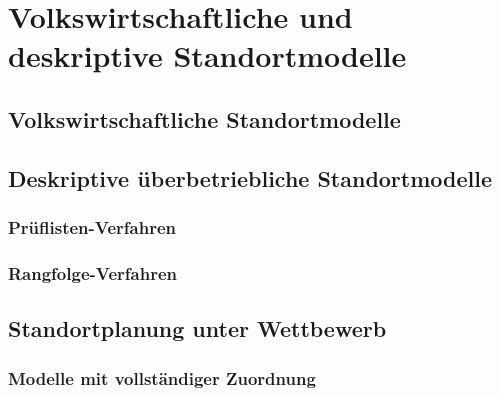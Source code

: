\section{Volkswirtschaftliche und deskriptive Standortmodelle} %
    \label{cha:volkswirtschaftliche_und_deskriptive_standortmodelle}

      \subsection{Volkswirtschaftliche Standortmodelle} %
      \label{sub:volkswirtschaftliche_standortmodelle}
      

      \subsection{Deskriptive überbetriebliche Standortmodelle} %
      \label{sub:deskriptive_berbetriebliche_standortmodelle}
      
        \subsubsection{Prüflisten-Verfahren} %
        \label{ssub:pr_flisten_verfahren}
        

        \subsubsection{Rangfolge-Verfahren} %
        \label{ssub:rangfolge_verfahren}
        


      \subsection{Standortplanung unter Wettbewerb} %
      \label{sec:standortplanung_unter_wettbewerb}

        \subsubsection{Modelle mit vollständiger Zuordnung} %
        \label{ssub:modelle_mit_vollst_ndiger_zuordnung}
        
